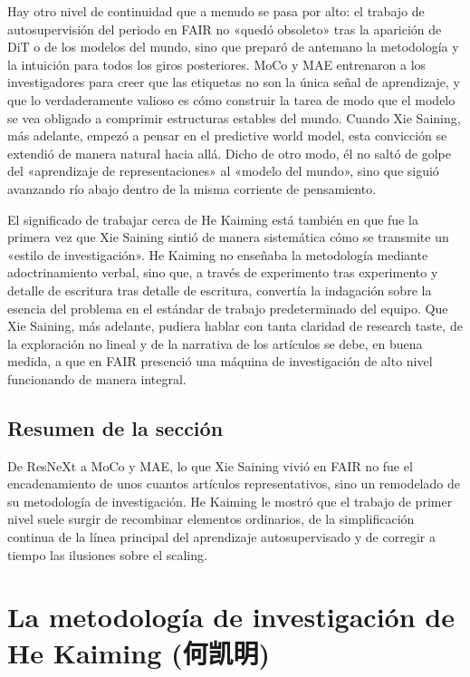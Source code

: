 \documentclass[a4paper,12pt]{article}
\begin{document}
Hay otro nivel de continuidad que a menudo se pasa por alto: el trabajo de autosupervisión del periodo en FAIR no «quedó obsoleto» tras la aparición de DiT o de los modelos del mundo, sino que preparó de antemano la metodología y la intuición para todos los giros posteriores. MoCo y MAE entrenaron a los investigadores para creer que las etiquetas no son la única señal de aprendizaje, y que lo verdaderamente valioso es cómo construir la tarea de modo que el modelo se vea obligado a comprimir estructuras estables del mundo. Cuando Xie Saining, más adelante, empezó a pensar en el predictive world model, esta convicción se extendió de manera natural hacia allá. Dicho de otro modo, él no saltó de golpe del «aprendizaje de representaciones» al «modelo del mundo», sino que siguió avanzando río abajo dentro de la misma corriente de pensamiento.

El significado de trabajar cerca de He Kaiming está también en que fue la primera vez que Xie Saining sintió de manera sistemática cómo se transmite un «estilo de investigación». He Kaiming no enseñaba la metodología mediante adoctrinamiento verbal, sino que, a través de experimento tras experimento y detalle de escritura tras detalle de escritura, convertía la indagación sobre la esencia del problema en el estándar de trabajo predeterminado del equipo. Que Xie Saining, más adelante, pudiera hablar con tanta claridad de research taste, de la exploración no lineal y de la narrativa de los artículos se debe, en buena medida, a que en FAIR presenció una máquina de investigación de alto nivel funcionando de manera integral.

\subsection{Resumen de la sección}

De ResNeXt a MoCo y MAE, lo que Xie Saining vivió en FAIR no fue el encadenamiento de unos cuantos artículos representativos, sino un remodelado de su metodología de investigación. He Kaiming le mostró que el trabajo de primer nivel suele surgir de recombinar elementos ordinarios, de la simplificación continua de la línea principal del aprendizaje autosupervisado y de corregir a tiempo las ilusiones sobre el scaling.
\section{La metodología de investigación de He Kaiming (何凯明)}
\end{document}
